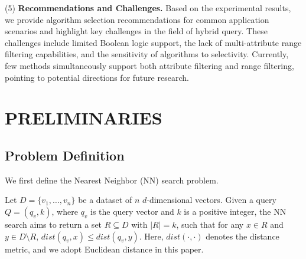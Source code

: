 \documentclass[sigconf, nonacm]{acmart}
\begin{document}
	
	{(5)\textbf{ Recommendations and Challenges.}
	Based on the experimental results, we provide algorithm selection recommendations for common application scenarios and highlight key challenges in the field of hybrid query. These challenges include limited Boolean logic support, the lack of multi-attribute range filtering capabilities, and the sensitivity of algorithms to selectivity. Currently, few methods simultaneously support both attribute filtering and range filtering, pointing to potential directions for future research.
	
	\section{PRELIMINARIES}
	
	\subsection{Problem Definition}
	
	We first define the Nearest Neighbor (NN) search problem.
	
	\begin{definition}[NN Search]
		
		Let \( D = \{v_1, \ldots, v_n\} \) be a dataset of \( n \) \( d \)-dimensional vectors. Given a query \( Q = (q_v, k) \), where \( q_v \) is the query vector and \( k \) is a positive integer, the NN search aims to return a set \( R \subseteq D \) with \( |R| = k \), such that for any \( x \in R \) and \( y \in D \setminus R \), \( \textit{dist}\!\left(q_v, x\right) \leq \textit{dist}\!\left(q_v, y\right) \). Here, \( \textit{dist}\!\left(\cdot, \cdot\right) \) denotes the distance metric, and we adopt Euclidean distance in this paper.
	\end{definition}
	
}
\end{document}
